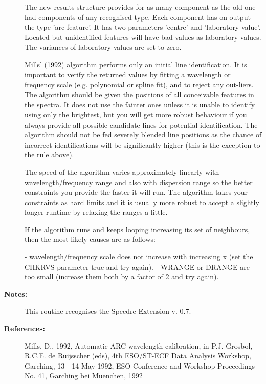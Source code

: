 \begin{description}
\begin{terminalv}
   The new results structure provides for as many component as the
   old one had components of any recognised type. Each component has
   on output the type 'arc feature'. It has two parameters 'centre'
   and 'laboratory value'. Located but unidentified features will
   have bad values as laboratory values. The variances of laboratory
   values are set to zero.

   Mills' (1992) algorithm performs only an initial line
   identification. It is important to verify the returned values by
   fitting a wavelength or frequency scale (e.g. polynomial or spline
   fit), and to reject any out-liers. The algorithm should be given
   the positions of all conceivable features in the spectra. It does
   not use the fainter ones unless it is unable to identify using
   only the brightest, but you will get more robust behaviour if you
   always provide all possible candidate lines for potential
   identification. The algorithm should not be fed severely blended
   line positions as the chance of incorrect identifications will be
   significantly higher (this is the exception to the rule above).

   The speed of the algorithm varies approximately linearly with
   wavelength/frequency range and also with dispersion range so the
   better constraints you provide the faster it will run. The
   algorithm takes your constraints as hard limits and it is usually
   more robust to accept a slightly longer runtime by relaxing the
   ranges a little.

   If the algorithm runs and keeps looping increasing its set of
   neighbours, then the most likely causes are as follows:

   -  wavelength/frequency scale does not increase with increasing x
      (set the CHKRVS parameter true and try again).
   -  WRANGE or DRANGE are too small (increase them both by
      a factor of 2 and try again).
\end{terminalv}

\item [\textbf{Notes:}]
  This routine recognises the Specdre Extension v. 0.7.


\item [\textbf{References:}]
   Mills, D., 1992, Automatic ARC wavelength calibration, in P.J.
   Grosbol, R.C.E. de Ruijsscher (eds), 4th ESO/ST-ECF Data
   Analysis Workshop, Garching, 13 - 14 May 1992, ESO Conference and
   Workshop Proceedings No. 41, Garching bei Muenchen, 1992
\end{description}
